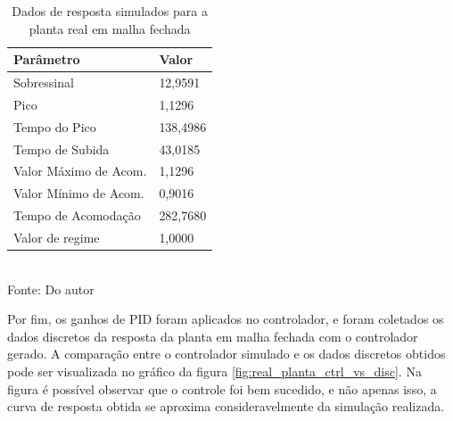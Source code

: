 \begin{table}[H]
    \caption{Dados de resposta simulados para a planta real em malha fechada}
    \centering
    \begin{tabular}{|l|l|}
        \hline
        \textbf{Parâmetro}    & \textbf{Valor} \\ \hline
        Sobressinal           & 12,9591        \\ \hline
        Pico                  & 1,1296         \\ \hline
        Tempo do Pico         & 138,4986       \\ \hline
        Tempo de Subida       & 43,0185        \\ \hline
        Valor Máximo de Acom. & 1,1296         \\ \hline
        Valor Mínimo de Acom. & 0,9016         \\ \hline
        Tempo de Acomodação   & 282,7680       \\ \hline
        Valor de regime       & 1,0000         \\ \hline
    \end{tabular}
    \label{tab:real_planta_response_data}
    \\
    \vspace{0cm}\hspace{0cm}\small{Fonte: Do autor}
\end{table}

Por fim, os ganhos de PID foram aplicados no controlador, e foram coletados os dados discretos da resposta da planta
em malha fechada com o controlador gerado.
A comparação entre o controlador simulado e os dados discretos obtidos pode ser visualizada no gráfico da figura
\ref{fig:real_planta_ctrl_vs_disc}.
Na figura é possível observar que o controle foi bem sucedido, e não apenas isso, a curva de resposta obtida se
aproxima consideravelmente da simulação realizada.

